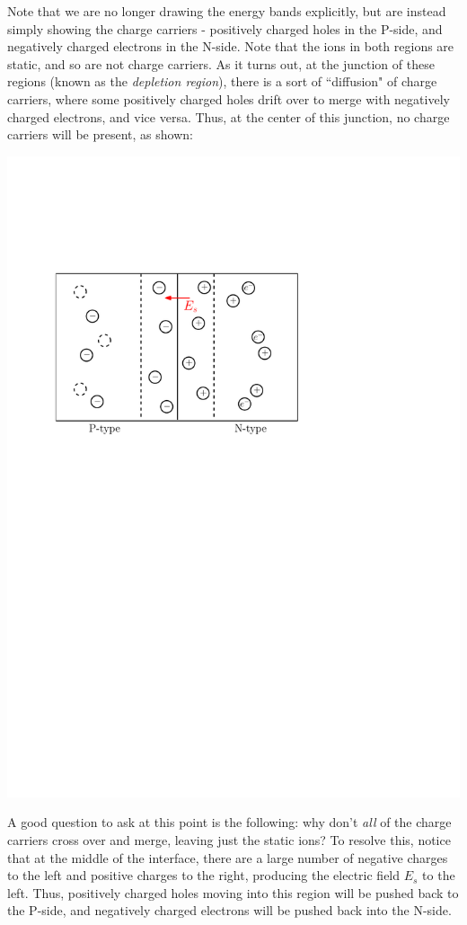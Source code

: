 \documentclass[letterpaper]{article}
\theoremstyle{remark}
\begin{document}
Note that we are no longer drawing the energy bands explicitly, but are instead simply showing the charge carriers - positively charged holes in the P-side, and negatively charged electrons in the N-side. Note that the ions in both regions are static, and so are not charge carriers. As it turns out, at the junction of these regions (known as the \emph{depletion region}), there is a sort of ``diffusion" of charge carriers, where some positively charged holes drift over to merge with negatively charged electrons, and vice versa. Thus, at the center of this junction, no charge carriers will be present, as shown:
\begin{center}
    \includegraphics[scale=0.7]{p_n_junction_2.pdf}
\end{center}

A good question to ask at this point is the following: why don't \emph{all} of the charge carriers cross over and merge, leaving just the static ions? To resolve this, notice that at the middle of the interface, there are a large number of negative charges to the left and positive charges to the right, producing the electric field $E_s$ to the left. Thus, positively charged holes moving into this region will be pushed back to the P-side, and negatively charged electrons will be pushed back into the N-side.
\end{document}
